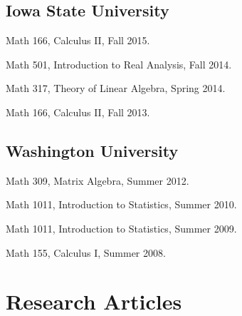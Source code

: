 \documentclass[10pt,letterpaper]{article}
\renewenvironment{itemize}{
  \begin{list}{}{
    \setlength{\leftmargin}{1.5em}
    \setlength{\itemsep}{0.25em}
    \setlength{\parskip}{0pt}
    \setlength{\parsep}{0.25em}
  }
}{
  \end{list}
}
\begin{document}
\hypertarget{iowa-state-university}{%
\subsection*{Iowa State University}\label{iowa-state-university}}

\begin{itemize}
\item
  Math 166, Calculus II, Fall 2015.
\item
  Math 501, Introduction to Real Analysis, Fall 2014.
\item
  Math 317, Theory of Linear Algebra, Spring 2014.
\item
  Math 166, Calculus II, Fall 2013.
\end{itemize}

\hypertarget{washington-university}{%
\subsection*{Washington University}\label{washington-university}}

\begin{itemize}
\item
  Math 309, Matrix Algebra, Summer 2012.
\item
  Math 1011, Introduction to Statistics, Summer 2010.
\item
  Math 1011, Introduction to Statistics, Summer 2009.
\item
  Math 155, Calculus I, Summer 2008.
\end{itemize}

\hypertarget{research-articles}{%
\section*{Research Articles}\label{research-articles}}
\end{document}
